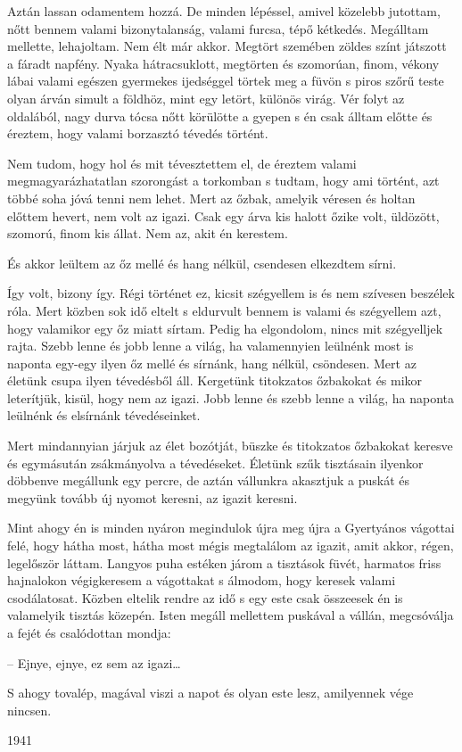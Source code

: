 \documentclass{IEEEtran}
\begin{document}
Aztán lassan odamentem hozzá. De minden lépéssel, amivel közelebb jutottam, nőtt bennem valami bizonytalanság, valami furcsa, tépő kétkedés. Megálltam mellette, lehajoltam. Nem élt már akkor. Megtört szemében zöldes színt játszott a fáradt napfény. Nyaka hátracsuklott, megtörten és szomorúan, finom, vékony lábai valami egészen gyermekes ijedséggel törtek meg a füvön s piros szőrű teste olyan árván simult a földhöz, mint egy letört, különös virág. Vér folyt az oldalából, nagy durva tócsa nőtt körülötte a gyepen s én csak álltam előtte és éreztem, hogy valami borzasztó tévedés történt.

Nem tudom, hogy hol és mit tévesztettem el, de éreztem valami megmagyarázhatatlan szorongást a torkomban s tudtam, hogy ami történt, azt többé soha jóvá tenni nem lehet. Mert az őzbak, amelyik véresen és holtan előttem hevert, nem volt az igazi. Csak egy árva kis halott őzike volt, üldözött, szomorú, finom kis állat. Nem az, akit én kerestem.

És akkor leültem az őz mellé és hang nélkül, csendesen elkezdtem sírni.

Így volt, bizony így. Régi történet ez, kicsit szégyellem is és nem szívesen beszélek róla. Mert közben sok idő eltelt s eldurvult bennem is valami és szégyellem azt, hogy valamikor egy őz miatt sírtam. Pedig ha elgondolom, nincs mit szégyelljek rajta. Szebb lenne és jobb lenne a világ, ha valamennyien leülnénk most is naponta egy-egy ilyen őz mellé és sírnánk, hang nélkül, csöndesen. Mert az életünk csupa ilyen tévedésből áll. Kergetünk titokzatos őzbakokat és mikor leterítjük, kisül, hogy nem az igazi. Jobb lenne és szebb lenne a világ, ha naponta leülnénk és elsírnánk tévedéseinket.

Mert mindannyian járjuk az élet bozótját, büszke és titokzatos őzbakokat keresve és egymásután zsákmányolva a tévedéseket. Életünk szűk tisztásain ilyenkor döbbenve megállunk egy percre, de aztán vállunkra akasztjuk a puskát és megyünk tovább új nyomot keresni, az igazit keresni.

Mint ahogy én is minden nyáron megindulok újra meg újra a Gyertyános vágottai felé, hogy hátha most, hátha most mégis megtalálom az igazit, amit akkor, régen, legelőször láttam. Langyos puha estéken járom a tisztások füvét, harmatos friss hajnalokon végigkeresem a vágottakat s álmodom, hogy keresek valami csodálatosat. Közben eltelik rendre az idő s egy este csak összeesek én is valamelyik tisztás közepén. Isten megáll mellettem puskával a vállán, megcsóválja a fejét és csalódottan mondja:

– Ejnye, ejnye, ez sem az igazi…

S ahogy tovalép, magával viszi a napot és olyan este lesz, amilyennek vége nincsen.  

1941
\end{document}

